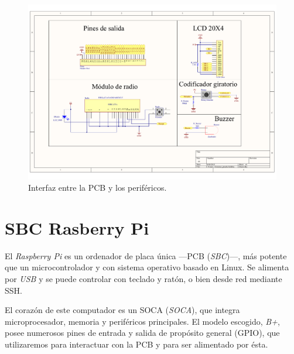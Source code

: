 \begin{figure}[H]
	\noindent \begin{centering}
		\includegraphics[width=\linewidth*2/3]{capitulo3/pcb_perifericos}
		\par\end{centering}
	\smallskip
	\caption{\label{fig:pcb_perifericos} Interfaz entre la PCB y los periféricos.}
\end{figure} 

\smallskip

\section{SBC Rasberry Pi}

El \textit{Raspberry Pi} es un ordenador de placa única ---\acrshort{PCB} (\textit{\acrlong{SBC}})---, más potente que un microcontrolador y con sistema operativo basado en Linux. Se alimenta por \textit{USB} y se puede controlar con teclado y ratón, o bien desde red mediante \acrshort{SSH}. 

El corazón de este computador es un \acrshort{SOCA} (\textit{\acrlong{SOCA}}), que integra microprocesador, memoria y periféricos principales. El modelo escogido, \textit{B+}, posee numerosos pines de entrada y salida de propósito general (\acrshort{GPIO}), que utilizaremos para interactuar con la \acrshort{PCB} y para ser alimentado por ésta.

\smallskip

